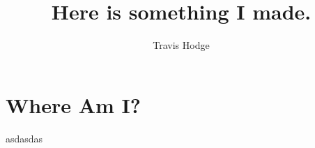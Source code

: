 \documentclass[12pt]{article}
\title{Here is something I made.}
\author{Travis Hodge}
\begin{document}
\maketitle

\section{Where Am I?}
asdasdas
\end{document}
